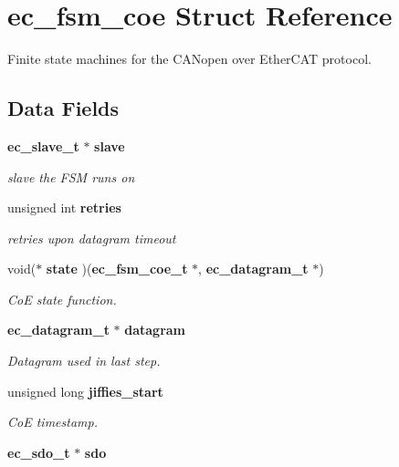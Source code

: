 \section{ec\-\_\-fsm\-\_\-coe Struct Reference}
\label{structec__fsm__coe}


Finite state machines for the C\-A\-Nopen over Ether\-C\-A\-T protocol.  


\subsection*{Data Fields}
\begin{DoxyCompactItemize}
\item 
{\bf ec\-\_\-slave\-\_\-t} $\ast$ {\bf slave}\label{structec__fsm__coe_a52d4a5703f091adfb825f6a9c313cee3}

\begin{DoxyCompactList}\small\item\em slave the F\-S\-M runs on \end{DoxyCompactList}\item 
unsigned int {\bf retries}\label{structec__fsm__coe_aeb93652dd379136a6db678b3b46add0f}

\begin{DoxyCompactList}\small\item\em retries upon datagram timeout \end{DoxyCompactList}\item 
void($\ast$ {\bf state} )({\bf ec\-\_\-fsm\-\_\-coe\-\_\-t} $\ast$, {\bf ec\-\_\-datagram\-\_\-t} $\ast$)\label{structec__fsm__coe_a2a82055fe216c468d8dcb1bba760fd5a}

\begin{DoxyCompactList}\small\item\em Co\-E state function. \end{DoxyCompactList}\item 
{\bf ec\-\_\-datagram\-\_\-t} $\ast$ {\bf datagram}
\begin{DoxyCompactList}\small\item\em Datagram used in last step. \end{DoxyCompactList}\item 
unsigned long {\bf jiffies\-\_\-start}
\begin{DoxyCompactList}\small\item\em Co\-E timestamp. \end{DoxyCompactList}\item 
{\bf ec\-\_\-sdo\-\_\-t} $\ast$ {\bf sdo}\label{structec__fsm__coe_a05afb369519ffb1dd6c0df68a4c6a127}


\end{DoxyCompactItemize}
